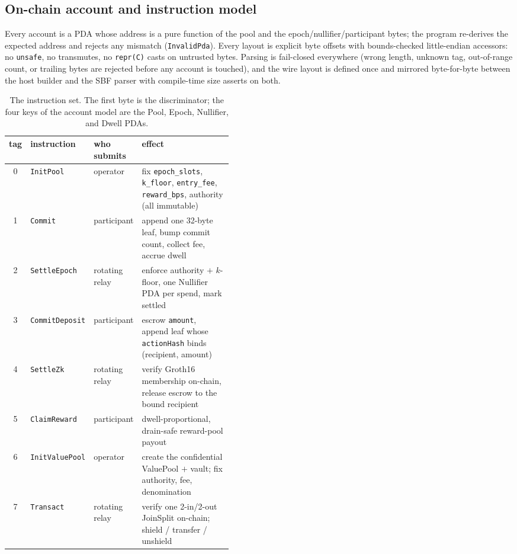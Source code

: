 \documentclass[10pt]{article}
\newcommand{\code}[1]{\texttt{#1}}
\begin{document}
\subsection{On-chain account and instruction model}

Every account is a PDA whose address is a pure function of the pool and the
epoch/nullifier/participant bytes; the program re-derives the expected address and
rejects any mismatch (\code{InvalidPda}). Every layout is explicit byte offsets
with bounds-checked little-endian accessors: no \code{unsafe}, no transmutes, no
\code{repr(C)} casts on untrusted bytes. Parsing is fail-closed everywhere (wrong
length, unknown tag, out-of-range count, or trailing bytes are rejected before any
account is touched), and the wire layout is defined once and mirrored byte-for-byte
between the host builder and the SBF parser with compile-time size asserts on both.

\begin{table}[h]
\centering
\small
\begin{tabular}{@{}cll p{0.44\linewidth}@{}}
\toprule
\textbf{tag} & \textbf{instruction} & \textbf{who submits} & \textbf{effect} \\
\midrule
0 & \code{InitPool} & operator & fix \code{epoch\_slots}, \code{k\_floor}, \code{entry\_fee}, \code{reward\_bps}, authority (all immutable) \\
1 & \code{Commit} & participant & append one 32-byte leaf, bump commit count, collect fee, accrue dwell \\
2 & \code{SettleEpoch} & rotating relay & enforce authority $+$ $k$-floor, one Nullifier PDA per spend, mark settled \\
3 & \code{CommitDeposit} & participant & escrow \code{amount}, append leaf whose \code{actionHash} binds (recipient, amount) \\
4 & \code{SettleZk} & rotating relay & verify Groth16 membership on-chain, release escrow to the bound recipient \\
5 & \code{ClaimReward} & participant & dwell-proportional, drain-safe reward-pool payout \\
6 & \code{InitValuePool} & operator & create the confidential ValuePool $+$ vault; fix authority, fee, denomination \\
7 & \code{Transact} & rotating relay & verify one 2-in/2-out JoinSplit on-chain; shield / transfer / unshield \\
\bottomrule
\end{tabular}
\caption{The instruction set. The first byte is the discriminator; the four keys
of the account model are the Pool, Epoch, Nullifier, and Dwell PDAs.}
\end{table}
\end{document}
